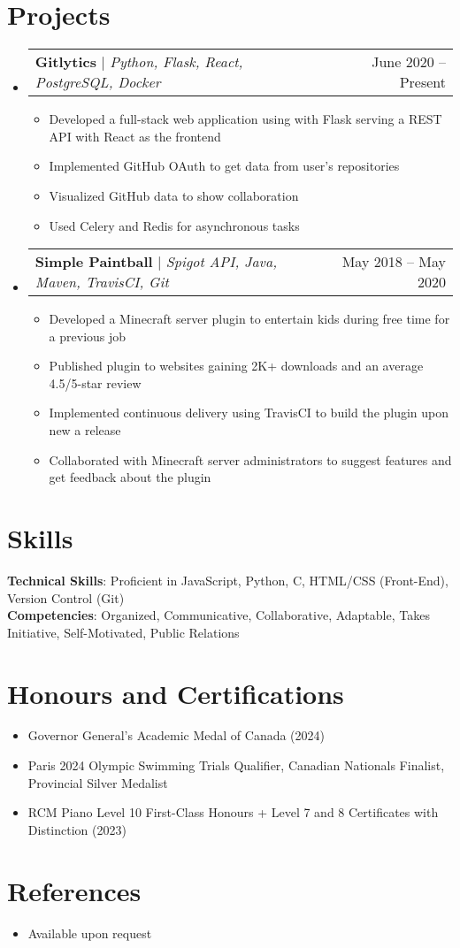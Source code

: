 \documentclass[letterpaper,11pt]{article}
\makeatletter
\newcommand{\resumeItem}[1]{
  \item\small{
    {#1 \vspace{-2pt}}
  }
}
\newcommand{\resumeProjectHeading}[2]{
    \item
    \begin{tabular*}{0.97\textwidth}{l@{\extracolsep{\fill}}r}
      \small#1 & #2 \\
    \end{tabular*}\vspace{-7pt}
}
\newcommand{\resumeSubHeadingListStart}{\begin{itemize}[leftmargin=0.15in, label={}]}
\newcommand{\resumeSubHeadingListEnd}{\end{itemize}}
\newcommand{\resumeItemListStart}{\begin{itemize}}
\newcommand{\resumeItemListEnd}{\end{itemize}\vspace{-8pt}}
\makeatother
\begin{document}
\section{Projects}
    \resumeSubHeadingListStart
      \resumeProjectHeading
          {\textbf{Gitlytics} $|$ \emph{Python, Flask, React, PostgreSQL, Docker}}{June 2020 -- Present}
          \resumeItemListStart
            \resumeItem{Developed a full-stack web application using with Flask serving a REST API with React as the frontend}
            \resumeItem{Implemented GitHub OAuth to get data from user’s repositories}
            \resumeItem{Visualized GitHub data to show collaboration}
            \resumeItem{Used Celery and Redis for asynchronous tasks}
          \resumeItemListEnd
      \resumeProjectHeading
          {\textbf{Simple Paintball} $|$ \emph{Spigot API, Java, Maven, TravisCI, Git}}{May 2018 -- May 2020}
          \resumeItemListStart
            \resumeItem{Developed a Minecraft server plugin to entertain kids during free time for a previous job}
            \resumeItem{Published plugin to websites gaining 2K+ downloads and an average 4.5/5-star review}
            \resumeItem{Implemented continuous delivery using TravisCI to build the plugin upon new a release}
            \resumeItem{Collaborated with Minecraft server administrators to suggest features and get feedback about the plugin}
          \resumeItemListEnd
    \resumeSubHeadingListEnd



%
\section{Skills}
 \begin{itemize}[leftmargin=0.15in, label={}]
    \small{\item{
     \textbf{Technical Skills}{: Proficient in JavaScript, Python, C, HTML/CSS (Front-End), Version Control (Git)} \\
     \textbf{Competencies}{: Organized, Communicative, Collaborative, Adaptable, Takes Initiative, Self-Motivated, Public Relations}
    }}
 \end{itemize}

\section{Honours and Certifications}
  \resumeItemListStart
    \vspace{-2pt}\resumeItem{Governor General's Academic Medal of Canada (2024)}
    \vspace{-2pt}\resumeItem{Paris 2024 Olympic Swimming Trials Qualifier, Canadian Nationals Finalist, Provincial Silver Medalist}
    \vspace{-2pt}\resumeItem{RCM Piano Level 10 First-Class Honours + Level 7 and 8 Certificates with Distinction (2023)}
  \resumeItemListEnd
\vspace{-2pt}

\section{References}
  \resumeItemListStart
    \resumeItem{Available upon request}
  \resumeItemListEnd

\end{document}
